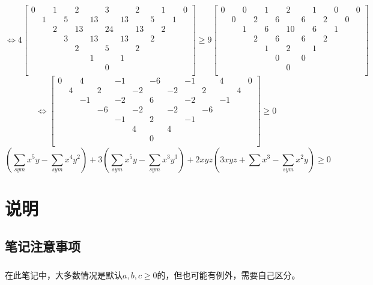 \documentclass[UTF8]{ctexart}
\begin{document}
$$\Leftrightarrow 
4\left[
\begin{smallmatrix}
	0& &1& &2& &3& &2& &1& &0\\
	&1& &5& &13& &13& &5& &1&\\
	& &2& &13& &24& &13& &2& &\\
	& & &3& &13& &13& &2& & &\\
	& & & &2& &5& &2& & & &\\
	& & & & &1& &1& & & & &\\
	& & & & & &0& & & & & &\\
\end{smallmatrix}
\right]\geq 9
\left[
\begin{smallmatrix}
	0& &0& &1& &2& &1& &0& &0\\
	&0& &2& &6& &6& &2& &0&\\
	& &1& &6& &10& &6& &1& &\\
	& & &2& &6& &6& &2& & &\\
	& & & &1& &2& &1& & & &\\
	& & & & &0& &0& & & & &\\
	& & & & & &0& & & & & &\\
\end{smallmatrix}
\right]
$$
$$\Leftrightarrow 
\left[
\begin{smallmatrix}
	0& &4& &-1& &-6& &-1& &4& &0\\
	&4& &2& &-2& &-2& &2& &4&\\
	& &-1& &-2& &6& &-2& &-1& &\\
	& & &-6& &-2& &-2& &-6& & &\\
	& & & &-1& &2& &-1& & & &\\
	& & & & &4& &4& & & & &\\
	& & & & & &0& & & & & &\\
\end{smallmatrix}
\right]\geq 0
$$
$$ (\displaystyle \sum _{sym} x^{5}y-\displaystyle \sum _{sym}x^{4}y^{2})+3(\displaystyle \sum _{sym}x^{5}y-\displaystyle \sum _{sym}x^{3}y^{3})+2xyz(3xyz+\displaystyle \sum x^{3}-\displaystyle \sum _{sym}x^{2}y)\geq 0 $$
\newpage
\tableofcontents
\newpage
\section{说明} 
\subsection{笔记注意事项}
\subsubsection{}在此笔记中，大多数情况是默认$ a,b,c\geq 0 $的，但也可能有例外，需要自己区分。
\end{document}

